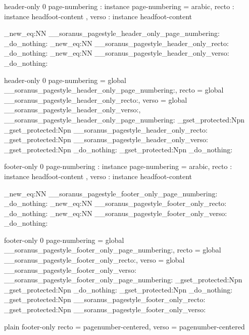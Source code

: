 %

 { header-only } { 0 }
  {
    page-numbering : instance { page-numbering } = arabic,
    recto          : instance { headfoot-content },
    verso          : instance { headfoot-content }
  }


\cs_new_eq:NN \__soranus_pagestyle_header_only_page_numbering: \prg_do_nothing:
\cs_new_eq:NN \__soranus_pagestyle_header_only_recto: \prg_do_nothing:
\cs_new_eq:NN \__soranus_pagestyle_header_only_verso: \prg_do_nothing:

 { header-only } { 0 }
  {
    page-numbering = global \__soranus_pagestyle_header_only_page_numbering:,
    recto          = global \__soranus_pagestyle_header_only_recto:,
    verso          = global \__soranus_pagestyle_header_only_verso:,
  }
  {
    \AssignTemplateKeys
    \__soranus_pagestyle_header_only_page_numbering:
    \cs_gset_protected:Npn \@mkboth { \markboth }
    \cs_gset_protected:Npn \@oddhead
      { \__soranus_pagestyle_header_only_recto: }
    \cs_gset_protected:Npn \@evenhead
      { \__soranus_pagestyle_header_only_verso: }
    \cs_gset_protected:Npn \@oddfoot
      { \prg_do_nothing: }
    \cs_gset_protected:Npn \@evenfoot
      { \prg_do_nothing: }
  }


%

 { footer-only } { 0 }
  {
    page-numbering : instance { page-numbering } = arabic,
    recto          : instance { headfoot-content },
    verso          : instance { headfoot-content }
  }


\cs_new_eq:NN \__soranus_pagestyle_footer_only_page_numbering: \prg_do_nothing:
\cs_new_eq:NN \__soranus_pagestyle_footer_only_recto: \prg_do_nothing:
\cs_new_eq:NN \__soranus_pagestyle_footer_only_verso: \prg_do_nothing:

 { footer-only } { 0 }
  {
    page-numbering = global \__soranus_pagestyle_footer_only_page_numbering:,
    recto          = global \__soranus_pagestyle_footer_only_recto:,
    verso          = global \__soranus_pagestyle_footer_only_verso:
  }
  {
    \AssignTemplateKeys
    \__soranus_pagestyle_footer_only_page_numbering:
    \cs_gset_protected:Npn \@mkboth { \markboth }
    \cs_gset_protected:Npn \@oddhead
      { \prg_do_nothing: }
    \cs_gset_protected:Npn \@evenhead
      { \prg_do_nothing: }
    \cs_gset_protected:Npn \@oddfoot
      { \__soranus_pagestyle_footer_only_recto: }
    \cs_gset_protected:Npn \@evenfoot
      { \__soranus_pagestyle_footer_only_verso: }
  }


%

 { plain } { footer-only }
  {
    recto = pagenumber-centered,
    verso = pagenumber-centered
  }
